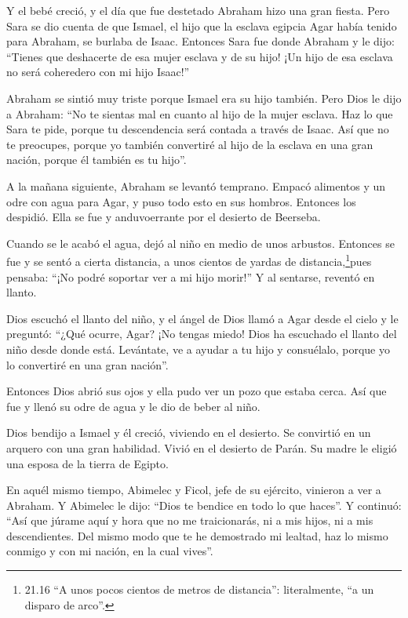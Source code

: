  Y el bebé creció, y el día que fue destetado Abraham hizo
una gran fiesta.  Pero Sara se dio cuenta de que Ismael, el
hijo que la esclava egipcia Agar había tenido para Abraham, se burlaba
de Isaac.  Entonces Sara fue donde Abraham y le dijo:
``Tienes que deshacerte de esa mujer esclava y de su hijo! ¡Un hijo de
esa esclava no será coheredero con mi hijo Isaac!''

 Abraham se sintió muy triste porque Ismael era su hijo
también.  Pero Dios le dijo a Abraham: ``No te sientas mal
en cuanto al hijo de la mujer esclava. Haz lo que Sara te pide, porque
tu descendencia será contada a través de Isaac.  Así que no
te preocupes, porque yo también convertiré al hijo de la esclava en una
gran nación, porque él también es tu hijo''.

 A la mañana siguiente, Abraham se levantó temprano. Empacó
alimentos y un odre con agua para Agar, y puso todo esto en sus hombros.
Entonces los despidió. Ella se fue y anduvoerrante por el desierto de
Beerseba.

 Cuando se le acabó el agua, dejó al niño en medio de unos
arbustos.  Entonces se fue y se sentó a cierta distancia, a
unos cientos de yardas de distancia,\footnote{21.16 ``A unos pocos
  cientos de metros de distancia'': literalmente, ``a un disparo de
  arco''.}pues pensaba: ``¡No podré soportar ver a mi hijo morir!'' Y al
sentarse, reventó en llanto.

 Dios escuchó el llanto del niño, y el ángel de Dios llamó
a Agar desde el cielo y le preguntó: ``¿Qué ocurre, Agar? ¡No tengas
miedo! Dios ha escuchado el llanto del niño desde donde está.
 Levántate, ve a ayudar a tu hijo y consuélalo, porque yo
lo convertiré en una gran nación''.

 Entonces Dios abrió sus ojos y ella pudo ver un pozo que
estaba cerca. Así que fue y llenó su odre de agua y le dio de beber al
niño.

 Dios bendijo a Ismael y él creció, viviendo en el
desierto. Se convirtió en un arquero con una gran habilidad.
 Vivió en el desierto de Parán. Su madre le eligió una
esposa de la tierra de Egipto.

 En aquél mismo tiempo, Abimelec y Ficol, jefe de su
ejército, vinieron a ver a Abraham. Y Abimelec le dijo: ``Dios te
bendice en todo lo que haces''.  Y continuó: ``Así que
júrame aquí y hora que no me traicionarás, ni a mis hijos, ni a mis
descendientes. Del mismo modo que te he demostrado mi lealtad, haz lo
mismo conmigo y con mi nación, en la cual vives''.

